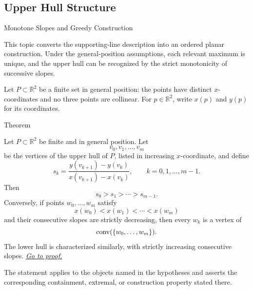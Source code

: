 \subsection*{Upper Hull Structure}

\begin{topicbox}{Monotone Slopes and Greedy Construction}
\begin{exposition}
This topic converts the supporting-line description into an ordered planar
construction. Under the general-position assumptions, each relevant maximum is
unique, and the upper hull can be recognized by the strict monotonicity of
successive slopes.
\end{exposition}

\begin{assumption}
\label{ass:computational-geometry-general-position}
Let \(P \subset \mathbb{R}^2\) be a finite set in general position: the points
have distinct \(x\)-coordinates and no three points are collinear. For
\(p \in \mathbb{R}^2\), write \(x(p)\) and \(y(p)\) for its coordinates.
\end{assumption}

\begin{theorembox}{Theorem}
\begin{theorem}
\label{thm:computational-geometry-monotone-slope-upper-hull}
Let \(P\subset\mathbb{R}^2\) be finite and in general position. Let
\[
  v_0,v_1,\dots,v_m
\]
be the vertices of the upper hull of \(P\), listed in increasing
\(x\)-coordinate, and define
\[
  s_k
  =
  \frac{y(v_{k+1})-y(v_k)}{x(v_{k+1})-x(v_k)},
  \qquad
  k=0,1,\dots,m-1.
\]
Then
\[
  s_0>s_1>\cdots>s_{m-1}.
\]
Conversely, if points \(w_0,\dots,w_m\) satisfy
\[
  x(w_0)<x(w_1)<\cdots<x(w_m)
\]
and their consecutive slopes are strictly decreasing, then every \(w_k\) is a
vertex of
\[
  \operatorname{conv}(\{w_0,\dots,w_m\}).
\]
The lower hull is characterized similarly, with strictly increasing consecutive
slopes.
\hyperref[prf:computational-geometry-monotone-slope-upper-hull]{\textit{Go to proof.}}
\end{theorem}
\end{theorembox}

\begin{remark*}
The statement applies to the objects named in the hypotheses and asserts the
corresponding containment, extremal, or construction property stated there.
\end{remark*}


\end{topicbox}
